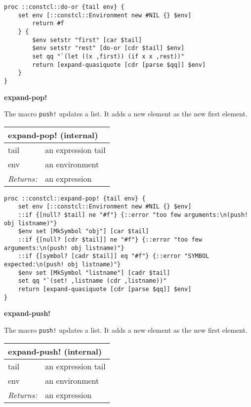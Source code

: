 \documentclass{report}
\begin{document}
\noindent\makebox[\linewidth]{\rule{\linewidth}{0.4pt}}
\begin{lstlisting}
proc ::constcl::do-or {tail env} {
    set env [::constcl::Environment new #NIL {} $env]
        return #f
    } {
        $env setstr "first" [car $tail]
        $env setstr "rest" [do-or [cdr $tail] $env]
        set qq "`(let ((x ,first)) (if x x ,rest))"
        return [expand-quasiquote [cdr [parse $qq]] $env]
    }
}
\end{lstlisting}
\noindent\makebox[\linewidth]{\rule{\linewidth}{0.4pt}}

\textbf{expand-pop!}


The macro \texttt{push!} updates a list. It adds a new element as the new first element.

\begin{tabular}{ |l l| }
\hline
\multicolumn{2}{|l|}{expand-pop! (internal)} \\
\hline
tail & an expression tail \\
env & an environment \\
\textit{Returns:} & an expression \\
\hline
\end{tabular}

\noindent\makebox[\linewidth]{\rule{\linewidth}{0.4pt}}
\begin{lstlisting}
proc ::constcl::expand-pop! {tail env} {
    set env [::constcl::Environment new #NIL {} $env]
    ::if {[null? $tail] ne "#f"} {::error "too few arguments:\n(push! obj listname)"}
    $env set [MkSymbol "obj"] [car $tail]
    ::if {[null? [cdr $tail]] ne "#f"} {::error "too few arguments:\n(push! obj listname)"}
    ::if {[symbol? [cadr $tail]] eq "#f"} {::error "SYMBOL expected:\n(push! obj listname)"}
    $env set [MkSymbol "listname"] [cadr $tail]
    set qq "`(set! ,listname (cdr ,listname))"
    return [expand-quasiquote [cdr [parse $qq]] $env]
}
\end{lstlisting}
\noindent\makebox[\linewidth]{\rule{\linewidth}{0.4pt}}

\textbf{expand-push!}


The macro \texttt{push!} updates a list. It adds a new element as the new first element.

\begin{tabular}{ |l l| }
\hline
\multicolumn{2}{|l|}{expand-push! (internal)} \\
\hline
tail & an expression tail \\
env & an environment \\
\textit{Returns:} & an expression \\
\hline
\end{tabular}
\end{document}
